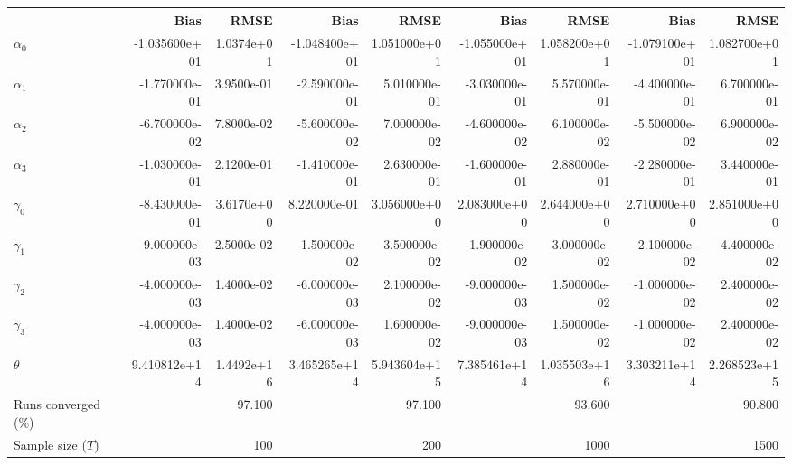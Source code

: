 
\begin{tabular}[t]{lrrrrrrrr}
\toprule
  & Bias & RMSE & Bias & RMSE & Bias & RMSE & Bias & RMSE\\
\midrule
$\alpha_{0}$ & -1.035600e+01 & 1.0374e+01 & -1.048400e+01 & 1.051000e+01 & -1.055000e+01 & 1.058200e+01 & -1.079100e+01 & 1.082700e+01\\
$\alpha_{1}$ & -1.770000e-01 & 3.9500e-01 & -2.590000e-01 & 5.010000e-01 & -3.030000e-01 & 5.570000e-01 & -4.400000e-01 & 6.700000e-01\\
$\alpha_{2}$ & -6.700000e-02 & 7.8000e-02 & -5.600000e-02 & 7.000000e-02 & -4.600000e-02 & 6.100000e-02 & -5.500000e-02 & 6.900000e-02\\
$\alpha_{3}$ & -1.030000e-01 & 2.1200e-01 & -1.410000e-01 & 2.630000e-01 & -1.600000e-01 & 2.880000e-01 & -2.280000e-01 & 3.440000e-01\\
$\gamma_{0}$ & -8.430000e-01 & 3.6170e+00 & 8.220000e-01 & 3.056000e+00 & 2.083000e+00 & 2.644000e+00 & 2.710000e+00 & 2.851000e+00\\
$\gamma_{1}$ & -9.000000e-03 & 2.5000e-02 & -1.500000e-02 & 3.500000e-02 & -1.900000e-02 & 3.000000e-02 & -2.100000e-02 & 4.400000e-02\\
$\gamma_{2}$ & -4.000000e-03 & 1.4000e-02 & -6.000000e-03 & 2.100000e-02 & -9.000000e-03 & 1.500000e-02 & -1.000000e-02 & 2.400000e-02\\
$\gamma_{3}$ & -4.000000e-03 & 1.4000e-02 & -6.000000e-03 & 1.600000e-02 & -9.000000e-03 & 1.500000e-02 & -1.000000e-02 & 2.400000e-02\\
$\theta$ & 9.410812e+14 & 1.4492e+16 & 3.465265e+14 & 5.943604e+15 & 7.385461e+14 & 1.035503e+16 & 3.303211e+14 & 2.268523e+15\\
Runs converged (\%) &  & 97.100 &  & 97.100 &  & 93.600 &  & 90.800\\
Sample size ($T$) &  & 100 &  & 200 &  & 1000 &  & 1500\\
\bottomrule
\end{tabular}
